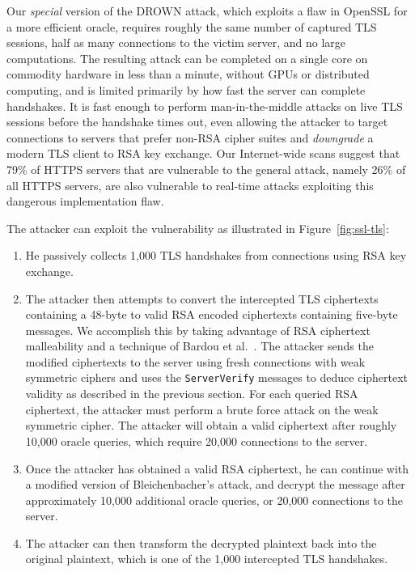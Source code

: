 Our \emph{special} version of the DROWN attack, which exploits a flaw in OpenSSL for a more efficient oracle,
requires roughly the same number of captured TLS sessions, half as many connections to the victim server, and no large computations.  
The resulting attack can be completed on a single core on
commodity hardware in less than a minute, without GPUs or distributed computing,
and is limited primarily by how fast the server can complete
handshakes.  It is fast enough to perform man-in-the-middle attacks on live TLS
sessions before the handshake times out, even allowing the attacker to
target connections to servers that prefer non-RSA cipher suites and \emph{downgrade} a modern TLS client to RSA key exchange.   Our Internet-wide scans suggest that 79\% of HTTPS servers that are vulnerable to the general attack, namely 26\% of all HTTPS servers,
are also vulnerable to real-time attacks exploiting this dangerous implementation flaw.

The attacker can exploit the \ssltwo vulnerability as illustrated in Figure~\ref{fig:ssl-tls}:
\begin{enumerate}
	\item He passively collects 1,000 TLS handshakes from connections using RSA key exchange.
	\item The attacker then attempts to convert the intercepted TLS ciphertexts containing a 48-byte \pms to valid RSA \PKCS encoded ciphertexts containing five-byte messages. We accomplish this by taking advantage of RSA ciphertext malleability and a technique of Bardou et al.~\cite{bardou2012efficient}. The attacker sends the modified ciphertexts to the server using fresh \ssltwo connections with weak symmetric ciphers and uses the \texttt{ServerVerify} messages to deduce ciphertext validity as described in the previous section. For each queried RSA ciphertext, the attacker must perform a brute force attack on the weak symmetric cipher. The attacker will obtain a valid \ssltwo ciphertext after roughly 10,000 oracle queries, which require 20,000 connections to the server.
	\item Once the attacker has obtained a valid \ssltwo RSA ciphertext, he can continue with a modified version of Bleichenbacher's attack, and decrypt the message after approximately 10,000 additional oracle queries, or 20,000 connections to the server.
	\item The attacker can then transform the decrypted plaintext back into the original plaintext, which is one of the 1,000 intercepted TLS handshakes.
\end{enumerate}


